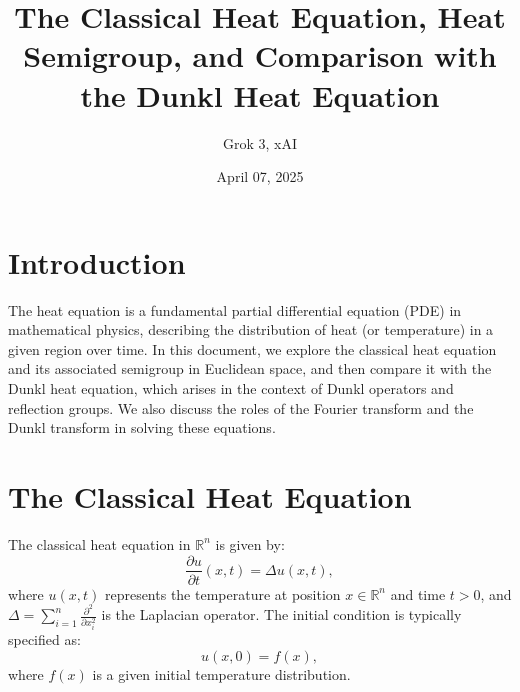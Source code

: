 \documentclass[a4paper,12pt]{article}
\title{The Classical Heat Equation, Heat Semigroup, and Comparison with the Dunkl Heat Equation}
\author{Grok 3, xAI}
\date{April 07, 2025}
\begin{document}
\maketitle

\section{Introduction}
The heat equation is a fundamental partial differential equation (PDE) in mathematical physics, describing the distribution of heat (or temperature) in a given region over time. In this document, we explore the classical heat equation and its associated semigroup in Euclidean space, and then compare it with the Dunkl heat equation, which arises in the context of Dunkl operators and reflection groups. We also discuss the roles of the Fourier transform and the Dunkl transform in solving these equations.

\section{The Classical Heat Equation}
The classical heat equation in $\mathbb{R}^n$ is given by:
\begin{equation}
\frac{\partial u}{\partial t}(x,t) = \Delta u(x,t),
\end{equation}
where $u(x,t)$ represents the temperature at position $x \in \mathbb{R}^n$ and time $t > 0$, and $\Delta = \sum_{i=1}^n \frac{\partial^2}{\partial x_i^2}$ is the Laplacian operator. The initial condition is typically specified as:
\begin{equation}
u(x,0) = f(x),
\end{equation}
where $f(x)$ is a given initial temperature distribution.
\end{document}
